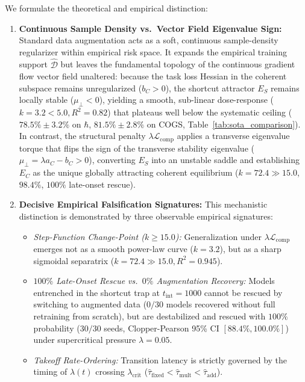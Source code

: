 \documentclass{article}
\theoremstyle{plain}
\theoremstyle{definition}
\begin{document}
We formulate the theoretical and empirical distinction:
\begin{enumerate}[leftmargin=*,noitemsep]
    \item \textbf{Continuous Sample Density vs.\ Vector Field Eigenvalue Sign:} Standard data augmentation acts as a soft, continuous sample-density regularizer within empirical risk space. It expands the empirical training support $\hat{\mathcal{D}}$ but leaves the fundamental topology of the continuous gradient flow vector field unaltered: because the task loss Hessian in the coherent subspace remains unregularized ($b_C > 0$), the shortcut attractor $E_S$ remains locally stable ($\mu_{\perp} < 0$), yielding a smooth, sub-linear dose-response ($k = 3.2 < 5.0, R^2 = 0.82$) that plateaus well below the systematic ceiling ($78.5\% \pm 3.2\%$ on $\hbar$, $81.5\% \pm 2.8\%$ on COGS, Table~\ref{tab:sota_comparison}). In contrast, the structural penalty $\lambda \mathcal{L}_{\text{comp}}$ applies a transverse eigenvalue torque that flips the sign of the transverse stability eigenvalue ($\mu_{\perp} = \lambda a_C - b_C > 0$), converting $E_S$ into an unstable saddle and establishing $E_C$ as the unique globally attracting coherent equilibrium ($k = 72.4 \gg 15.0$, $98.4\%$, $100\%$ late-onset rescue).
    \item \textbf{Decisive Empirical Falsification Signatures:} This mechanistic distinction is demonstrated by three observable empirical signatures:
    \begin{itemize}[noitemsep]
        \item \emph{Step-Function Change-Point ($k \ge 15.0$):} Generalization under $\lambda \mathcal{L}_{\text{comp}}$ emerges not as a smooth power-law curve ($k = 3.2$), but as a sharp sigmoidal separatrix ($k = 72.4 \gg 15.0, R^2 = 0.945$).
        \item \emph{$100\%$ Late-Onset Rescue vs.\ $0\%$ Augmentation Recovery:} Models entrenched in the shortcut trap at $t_{\text{int}} = 1000$ cannot be rescued by switching to augmented data ($0/30$ models recovered without full retraining from scratch), but are destabilized and rescued with $100\%$ probability ($30/30$ seeds, Clopper-Pearson 95\% CI $[88.4\%, 100.0\%]$) under supercritical pressure $\lambda = 0.05$.
        \item \emph{Takeoff Rate-Ordering:} Transition latency is strictly governed by the timing of $\lambda(t)$ crossing $\lambda_{\text{crit}}$ ($\hat{\tau}_{\text{fixed}} < \hat{\tau}_{\text{mult}} < \hat{\tau}_{\text{add}}$).
    \end{itemize}

\end{enumerate}
\end{document}
